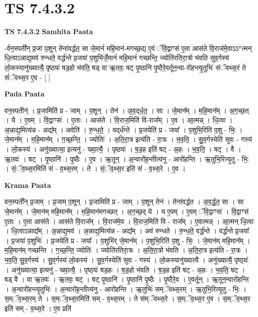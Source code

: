 \documentclass[17pt]{extarticle}
\begin{document}
\section{ TS 7.4.3.2 }

\textbf{TS 7.4.3.2 } \newline
\textbf{Samhita Paata} \newline

-र्वन॒स्पती᳚न् प्र॒जां प॒शून् तेना॑वर्द्धत॒ सा जे॒मानं॑ महि॒मान॑-मगच्छ॒द्य ए॒वं ॅवि॒द्वाꣳस॑ ए॒ता आस॑ते वि॒राज॑मे॒वाऽऽ*त्मन् धि॒त्वाऽन्नाद्य॒मव॑ रुन्धते॒ वर्द्ध॑न्ते प्र॒जया॑ प॒शुभि॑र्जे॒मानं॑ महि॒मानं॑ गच्छन्ति॒ ज्योति॑रतिरा॒त्रो भ॑वति सुव॒र्गस्य॑ लो॒कस्यानु॑ख्यात्यै॒ पृष्ठ्यः॑ षड॒हो भ॑वति॒ षड् वा ऋ॒तवः॒ षट् पृ॒ष्ठानि॑ पृ॒ष्ठैरे॒वर्तून॒न्वा-रो॑हन्त्यृ॒तुभिः॑ संॅवथ्स॒रं ते सं॑ॅवथ्स॒र ए॒व - [  ] \newline

\textbf{Pada Paata} \newline

वन॒स्पतीन्॑ । प्र॒जामिति॑ प्र - जाम् । प॒शून् । तेन॑ । अ॒व॒द्‌र्ध॒त॒ । सा । जे॒मान᳚म् । म॒हि॒मान᳚म् । अ॒ग॒च्छ॒त् । ये । ए॒वम् । वि॒द्वाꣳसः॑ । ए॒ताः । आस॑ते । वि॒राज॒मिति॑ वि-राज᳚म् । ए॒व । आ॒त्मन्न् । धि॒त्वा । अ॒न्नाद्य॒मित्य॑न्न - अद्य᳚म् । अवेति॑ । रु॒न्ध॒ते॒ । वद्‌र्ध॑न्ते । प्र॒जयेति॑ प्र - जया᳚ । प॒शुभि॒रिति॑ प॒शु - भिः॒ । जे॒मान᳚म् । म॒हि॒मान᳚म् । ग॒च्छ॒न्ति॒ । ज्योतिः॑ । अ॒ति॒रा॒त्र इत्य॑ति - रा॒त्रः । भ॒व॒ति॒ । सु॒व॒र्गस्येति॑ सुवः - गस्य॑ । लो॒कस्य॑ । अनु॑ख्यात्या॒ इत्यनु॑ - ख्या॒त्यै॒ । पृष्ठ्यः॑ । ष॒ड॒ह इति॑ षट् - अ॒हः । भ॒व॒ति॒ । षट् । वै । ऋ॒तवः॑ । षट् । पृ॒ष्ठानि॑ । पृ॒ष्ठैः । ए॒व । ऋ॒तून् । अ॒न्वारो॑ह॒न्तीत्य॑नु - आरो॑हन्ति । ऋ॒तुभि॒रित्यृ॒तु - भिः॒ । सं॒ॅव॒थ्स॒रमिति॑ सं - व॒थ्स॒रम् । ते । सं॒ॅव॒थ्स॒र इति॑ सं - व॒थ्स॒रे । ए॒व ।  \newline


\textbf{Krama Paata} \newline

वन॒स्पती᳚न् प्र॒जाम् । प्र॒जाम् प॒शून् । प्र॒जामिति॑ प्र - जाम् । प॒शून् तेन॑ । तेना॑वर्द्धत । अ॒व॒र्द्ध॒त॒ सा । सा जे॒मान᳚म् । जे॒मान॑म् महि॒मान᳚म् । म॒हि॒मान॑मगच्छत् । अ॒ग॒च्छ॒द् ये । य ए॒वम् । ए॒वम् ॅवि॒द्वाꣳसः॑ । वि॒द्वाꣳस॑ ए॒ताः । ए॒ता आस॑ते । आस॑ते वि॒राज᳚म् । वि॒राज॑मे॒व । वि॒राज॒मिति॑ वि - राज᳚म् । ए॒वात्मन्न् । आ॒त्मन् धि॒त्वा । धि॒त्वाऽन्नाद्य᳚म् । अ॒न्नाद्य॒मव॑ । अ॒न्नाद्य॒मित्य॑न्न - अद्य᳚म् । अव॑ रुन्धते । रु॒न्ध॒ते॒ वर्द्ध॑न्ते । वर्द्ध॑न्ते प्र॒जया᳚ । प्र॒जया॑ प॒शुभिः॑ । प्र॒जयेति॑ प्र - जया᳚ । प॒शुभि॑र् जे॒मान᳚म् । प॒शुभि॒रिति॑ प॒शु - भिः॒ । जे॒मान॑म् महि॒मान᳚म् । म॒हि॒मान॑म् गच्छन्ति । ग॒च्छ॒न्ति॒ ज्योतिः॑ । ज्योति॑रतिरा॒त्रः । अ॒ति॒रा॒त्रो भ॑वति । अ॒ति॒रा॒त्र इत्य॑ति - रा॒त्रः । भ॒व॒ति॒ सु॒व॒र्गस्य॑ । सु॒व॒र्गस्य॑ लो॒कस्य॑ । सु॒व॒र्गस्येति॑ सुवः - गस्य॑ । लो॒कस्यानु॑ख्यात्यै । अनु॑ख्यात्यै॒ पृष्ठ्‍यः॑ । अनु॑ख्यात्या॒ इत्यनु॑ - ख्या॒त्यै॒ । पृष्ठ्‍यः॑ षड॒हः । ष॒ड॒हो भ॑वति । ष॒ड॒ह इति॑ षट् - अ॒हः । भ॒व॒ति॒ षट् । षड् वै । वा ऋ॒तवः॑ । ऋ॒तवः॒ षट् । षट् पृ॒ष्ठानि॑ । पृ॒ष्ठानि॑ पृ॒ष्ठैः । पृ॒ष्ठैरे॒व । ए॒वर्तून् । ऋ॒तून॒न्वारो॑हन्ति । अ॒न्वारो॑हन्त्यृ॒तुभिः॑ । अ॒न्वारो॑ह॒न्तीत्य॑नु - आरो॑हन्ति । ऋ॒तुभिः॑ सम्ॅवथ्स॒रम् । ऋ॒तुभि॒रित्यृ॒तु - भिः॒ । स॒म्ॅव॒थ्स॒रम् ते । स॒म्ॅव॒थ्स॒रमिति॑ सम् - व॒थ्स॒रम् । ते स॑म्ॅवथ्स॒रे । स॒म्ॅव॒थ्स॒र ए॒व । स॒म्ॅव॒थ्स॒र इति॑ सम् - व॒थ्स॒रे । ए॒व प्रति॑ \newline
\end{document}
